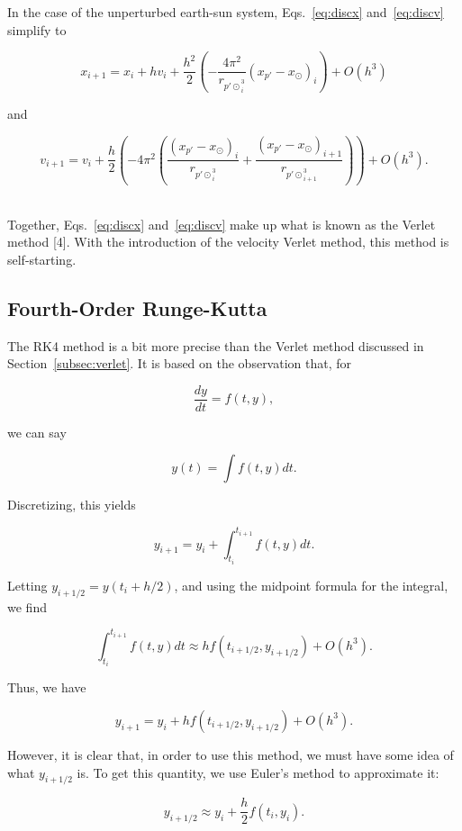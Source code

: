 \documentclass[12pt]{article}
\numberwithin{equation}{section}
\begin{document}
\noindent In the case of the unperturbed earth-sun system, Eqs.~\ref{eq:discx} and~\ref{eq:discv} simplify to

$$
x_{i+1} =  x_{i}+hv_{i}+\frac{h^{2}}{2}\left(-\frac{4\pi^{2}}{r_{p\prime\odot}_{i}^{3}}\left(x_{p\prime}-x_{\odot}\right)_{i}\right)+O\left(h^{3}\right)
$$

\noindent and

$$
v_{i+1} =  v_{i}+\frac{h}{2}\left(-4\pi^{2}\left(\frac{\left(x_{p\prime}-x_{\odot}\right)_{i}}{r_{p\prime\odot}_{i}^{3}}+\frac{\left(x_{p\prime}-x_{\odot}\right)_{i+1}}{r_{p\prime\odot}_{i+1}^{3}}\right)\right)+O\left(h^{3}\right).
$$

\\\indent Together, Eqs.~\ref{eq:discx} and~\ref{eq:discv} make up what is known as the Verlet method [4].  With the introduction of the velocity Verlet method, this method is self-starting.

\subsection{Fourth-Order Runge-Kutta}
\label{subsec:rk4}

The RK4 method is a bit more precise than the Verlet method discussed in Section~\ref{subsec:verlet}.  It is based on the observation that, for

$$
\frac{dy}{dt} = f\left(t,y\right),
$$

\noindent we can say

$$
y\left(t\right) = \int f\left(t,y\right)dt.
$$

\noindent Discretizing, this yields

$$
y_{i+1}=y_{i} + \int_{t_{i}}^{t_{i+1}}f\left(t,y\right)dt.
$$

\noindent Letting $y_{i+1/2} = y\left(t_{i}+h/2\right)$, and using the midpoint formula for the integral, we find 

$$
\int_{t_{i}}^{t_{i+1}}f\left(t,y\right)dt \approx hf\left(t_{i+1/2},y_{i+1/2}\right)+O\left(h^{3}\right).
$$

\noindent Thus, we have

$$
y_{i+1}=y_{i} +  hf\left(t_{i+1/2},y_{i+1/2}\right)+O\left(h^{3}\right).
$$

\noindent However, it is clear that, in order to use this method, we must have some idea of what $y_{i+1/2}$ is.  To get this quantity, we use Euler's method to approximate it:

$$
y_{i+1/2} \approx y_{i}+\frac{h}{2}f\left(t_{i},y_{i}\right).
$$
\end{document}
